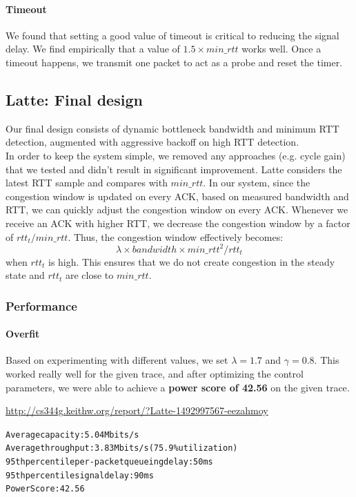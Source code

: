 \documentclass{article}
\begin{document}
\paragraph{Timeout} We found that setting a good value of timeout is
critical to reducing the signal delay. We find empirically that a
value of $1.5 \times min\_rtt$ works well. Once a timeout happens, we
transmit one packet to act as a probe and reset the timer.

\subsection{Latte: Final design}
Our final design consists of dynamic bottleneck bandwidth and minimum
RTT detection, augmented with aggressive backoff on high RTT
detection.\\

In order to keep the system simple, we removed any approaches (e.g.
cycle gain) that we tested and didn't result in significant
improvement. Latte considers the latest RTT sample and compares with
$min\_rtt$. In our system, since the congestion window is updated on
every ACK, based on measured bandwidth and RTT, we can quickly adjust
the congestion window on every ACK. Whenever we receive an ACK with
higher RTT, we decrease the congestion window by a factor of $rtt_t /
min\_rtt$.  Thus, the congestion window effectively becomes:
\[
  \lambda \times bandwidth \times min\_rtt^2 / rtt_t
\]
when $rtt_t$ is high. This ensures that we do not create congestion in
the steady state and $rtt_t$ are close to $min\_rtt$. 

\clearpage
\subsubsection{Performance}
\paragraph{Overfit}
Based on experimenting with different values, we set $\lambda = 1.7$
and $\gamma = 0.8$.  This worked really well for the given trace, and
after optimizing the control parameters, we were able to achieve a
\textbf{power score of 42.56} on the given trace.

\url{http://cs344g.keithw.org/report/?Latte-1492997567-eezahmoy}\\

\begin{mdframed}
\begin{alltt}
Average capacity: 5.04 Mbits/s
Average throughput: 3.83 Mbits/s (75.9\% utilization)
95th percentile per-packet queueing delay: 50 ms
95th percentile signal delay: 90 ms
Power Score: 42.56
\end{alltt}
\end{mdframed}
\end{document}
